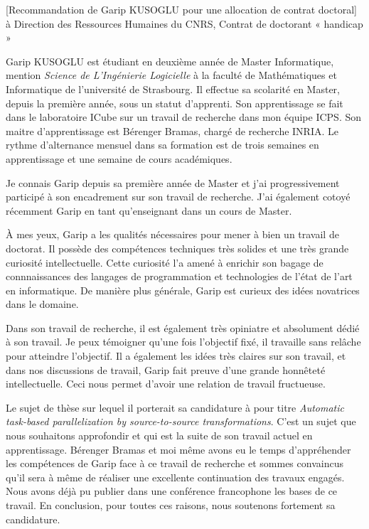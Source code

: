 \documentclass[a4paper,10pt]{article}
\begin{document}

\begin{letter}[Recommandation de Garip \textsc{KUSOGLU} pour une allocation de
  contrat doctoral]%
  {à}%
  {Direction des Ressources Humaines du CNRS, Contrat de doctorant « handicap »}


Garip KUSOGLU  est étudiant  en deuxième année  de Master  Informatique, mention
\textit{Science de  L'Ingénierie Logicielle}  à la  faculté de  Mathématiques et
Informatique de l'université de Strasbourg.  Il effectue sa scolarité en Master,
depuis la première  année, sous un statut d'apprenti. Son  apprentissage se fait
dans le laboratoire ICube sur un travail de recherche dans mon équipe ICPS.  Son
maitre d'apprentissage est Bérenger Bramas, chargé de recherche INRIA. Le rythme
d'alternance mensuel dans sa formation est de trois semaines en apprentissage et
une semaine de cours académiques.
  
  Je connais  Garip depuis sa première  année de Master et  j'ai progressivement
  participé  à son  encadrement sur  son  travail de  recherche. J'ai  également
  cotoyé  récemment Garip  en  tant  qu'enseignant dans un  cours  de Master.

À mes yeux, Garip a les qualités nécessaires pour mener à bien un travail de
doctorat. Il  possède des compétences techniques très solides et une très grande
curiosité intellectuelle. Cette curiosité l'a amené à enrichir son bagage de
connnaissances des langages  de programmation et technologies de l'état de l'art
en informatique. De manière plus générale, Garip est curieux des idées
novatrices dans le domaine.

Dans son travail de recherche, il est également très
opiniatre et absolument dédié à son travail. Je peux témoigner qu'une fois
l'objectif fixé, il travaille sans relâche pour atteindre l'objectif. Il a
également les idées très claires sur son travail, et dans nos discussions de
travail, Garip fait preuve d'une grande honnêteté intellectuelle. Ceci nous permet
d'avoir une relation de travail fructueuse.

Le sujet de thèse sur lequel il porterait sa candidature à pour titre
\textit{Automatic task-based parallelization by source-to-source
  transformations}. C'est un sujet que nous souhaitons approfondir et qui  est la suite de son travail
actuel en apprentissage. Bérenger Bramas et moi même avons eu le temps
d'appréhender les compétences de Garip face à ce travail de recherche et sommes
convaincus qu'il sera à même de réaliser une excellente continuation des travaux
engagés. Nous avons déjà pu publier dans une conférence francophone les bases de
ce travail. 
En conclusion, pour toutes ces raisons, nous soutenons fortement sa candidature.


\end{letter}
\end{document}
